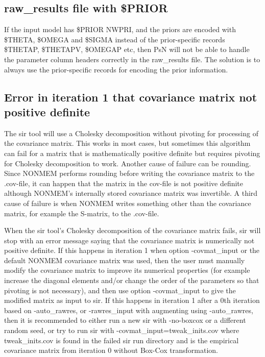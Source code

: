 \subsection*{raw\_results file with \$PRIOR}
If the input model has \$PRIOR NWPRI, and the priors are encoded with \$THETA, \$OMEGA and \$SIGMA instead of the prior-specific records \$THETAP, \$THETAPV, \$OMEGAP etc, then PsN will not be able to handle the parameter column headers correctly in the raw\_results file. The solution is to always use the prior-specific records for encoding the prior information.
\subsection*{Error in iteration 1 that covariance matrix not positive definite}
The sir tool will use a Cholesky decomposition without pivoting for processing of the covariance matrix. This works in most cases, but sometimes this algorithm can fail for a matrix that is mathematically positive definite but requires pivoting for Cholesky decomposition to work. Another cause of failure can be rounding. Since NONMEM performs rounding before writing
the covariance matrix to the .cov-file, it can happen that the matrix in the cov-file is not positive definite although NONMEM's internally stored covariance matrix was invertible. A third cause of failure is when NONMEM writes something other than the covariance matrix, for example the S-matrix, to the .cov-file.

When the sir tool's Cholesky decomposition of the covariance matrix fails, sir will stop with an error message saying that the covariance matrix is numerically not positive definite. If this happens in iteration 1 when option -covmat\_input or the default NONMEM covariance matrix was used, then the user must manually modify the covariance matrix to improve its numerical properties (for example increase the diagonal elements and/or change the order of the parameters so that pivoting is not necessary), and then use option -covmat\_input to give the modified matrix as input to sir. If this happens in iteration 1 after a 0th iteration based on -auto\_rawres, or -rawres\_input with augmenting using -auto\_rawres, then it is recommended to either run a new sir with -no-boxcox or a different random seed, or try to run sir with -covmat\_input=tweak\_inits.cov where tweak\_inits.cov is found in the failed sir run directory and is the empirical covariance matrix from iteration 0 without Box-Cox transformation.

